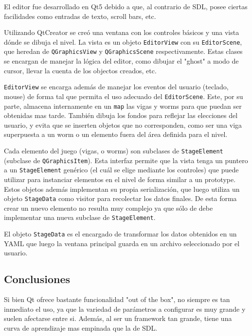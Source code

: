 El editor fue desarrollado en Qt5 debido a que, al contrario de SDL, posee ciertas facilidades como
entradas de texto, scroll bars, etc.

Utilizando QtCreator se creó una ventana con los controles básicos y una vista dónde se dibuja el nivel.
La vista es un objeto \texttt{EditorView} con su \texttt{EditorScene}, que heredan de \texttt{QGraphicsView}
y \texttt{QGraphicsScene} respectivamente. Estas clases se encargan de manejar la lógica del editor, como
dibujar el "ghost" a modo de cursor, llevar la cuenta de los objectos creados, etc.

\texttt{EditorView} se encarga además de manejar los eventos del usuario (teclado, mouse) de forma tal que
permita el uso adecuado del \texttt{EditorScene}. Este, por su parte, almacena internamente en un \texttt{map}
las vigas y worms para que puedan ser obtenidas mas tarde. También dibuja los fondos para reflejar las elecciones
del usuario, y evita que se inserten objetos que no corresponden, como ser una viga superpuesta a un worm o
un elemento fuera del área definida para el nivel.

Cada elemento del juego (vigas, o worms) son subclases de \texttt{StageElement} (subclase de \texttt{QGraphicsItem}).
Esta interfaz permite que la vista tenga un puntero a un \texttt{StageElement} genérico (el cuál se elige mediante
los controles) que puede utilizar para instanciar elementos en el nivel de forma similar a un prototype.
Estos objetos además implementan su propia serialización, que luego utiliza un objeto \texttt{StageData}
como visitor para recolectar los datos finales. De esta forma crear un nuevo elemento no resulta muy complejo
ya que sólo de debe implementar una nueva subclase de \texttt{StageElement}.

El objeto \texttt{StageData} es el encargado de transformar los datos obtenidos en un YAML que luego la
ventana principal guarda en un archivo seleccionado por el usuario.


\subsection{Conclusiones}

Si bien Qt ofrece bastante funcionalidad "out of the box", no siempre es tan inmediato el uso, ya que
la variedad de parámetros a configurar es muy grande y suelen afectarse entre si. Además, al ser un
framework tan grande, tiene una curva de aprendizaje mas empinada que la de SDL.
